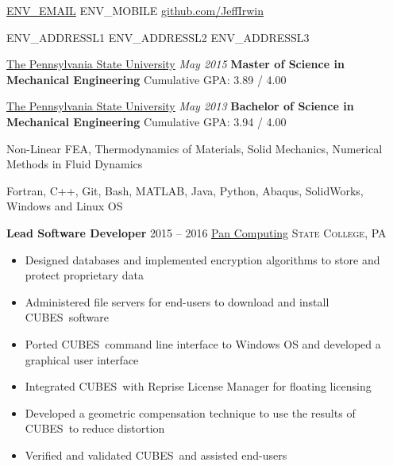 \documentclass[10.5pt,letterpaper]{article}
\begin{document}
\sloppy  %


\nobreakvspace{0.3em}  %


\noindent
\href{mailto:ENV\_EMAIL}{ENV\_EMAIL}\sbull
ENV\_MOBILE\sbull
\href{https://github.com/JeffIrwin}{github.com/JeffIrwin}

\noindent
ENV\_ADDRESSL1\sbull
ENV\_ADDRESSL2\sbull
ENV\_ADDRESSL3

\spacedhrule{1.0em}{-0.5em}  %

\noindent \href{https://www.psu.edu/}{The Pennsylvania State University} \hfill \emph{May 2015} \break
\textbf{Master of Science in Mechanical Engineering} \hfill Cumulative GPA:  3.89 / 4.00

\vspace{1em}
\noindent \href{https://www.psu.edu/}{The Pennsylvania State University} \hfill \emph{May 2013} \break
\textbf{Bachelor of Science in Mechanical Engineering} \hfill Cumulative GPA:  3.94 / 4.00

Non-Linear FEA, Thermodynamics of Materials, Solid Mechanics, Numerical Methods in Fluid Dynamics

Fortran, C++, Git, Bash, MATLAB, Java, Python, Abaqus, SolidWorks, Windows and Linux OS

\spacedhrule{0.5em}{-0.5em}

\noindent \textbf{Lead Software Developer} \hfill 2015 -- 2016 \break
\href{http://www.pancomputing.com}{Pan Computing} \hfill \textsc{State College, PA}
\begin{itemize}
	\setlength{\parskip}{0em}
	\item Designed databases and implemented encryption algorithms to store and protect proprietary data
	\item Administered file servers for end-users to download and install CUBES\textsuperscript\textregistered\ software
	\item Ported CUBES\textsuperscript\textregistered\ command line interface to Windows OS and developed a graphical user interface
	\item Integrated CUBES\textsuperscript\textregistered\ with Reprise License Manager for floating licensing
	\item Developed a geometric compensation technique to use the results of CUBES\textsuperscript\textregistered\ to reduce distortion
	\item Verified and validated CUBES\textsuperscript\textregistered\ and assisted end-users
\end{itemize}
\end{document}
